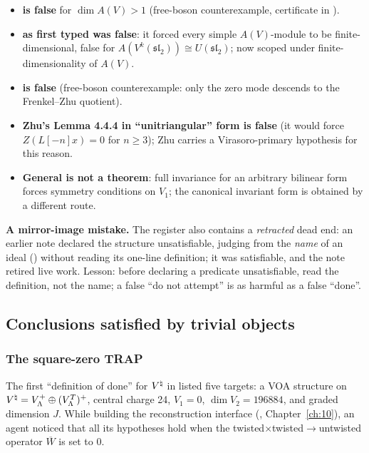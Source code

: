 \begin{itemize}
  . (The underlying cause was a helper
  definition returning a junk value on inhomogeneous vectors.)
\item \textbf{ is false} for $\dim A(V)>1$ (free-boson
  counterexample, certificate  in
  ).
\item \textbf{ as first typed was false}: it forced every simple
  $A(V)$-module to be finite-dimensional, false for $A(V^k(\mathfrak{sl}_2))\cong U(\mathfrak{sl}_2)$;
  now scoped under finite-dimensionality of $A(V)$.
\item \textbf{ is false} (free-boson counterexample: only the zero mode
  descends to the Frenkel--Zhu quotient).
\item \textbf{Zhu's Lemma 4.4.4 in ``unitriangular'' form is false} (it would force
  $Z(L[-n]x)=0$ for $n\ge3$); Zhu carries a Virasoro-primary hypothesis for this reason.
\item \textbf{General  is not a theorem}: full invariance for an arbitrary
  bilinear form forces symmetry conditions on $V_1$; the canonical invariant form is obtained by a
  different route.
\end{itemize}

\begin{warning}
\textbf{A mirror-image mistake.} The register also contains a \emph{retracted} dead end: an earlier
note declared the structure  unsatisfiable, judging from the \emph{name} of
an ideal () without reading its one-line definition; it was satisfiable, and the
note retired live work. Lesson: before declaring a predicate
unsatisfiable, read the definition, not the name; a false ``do not attempt'' is as harmful as a
false ``done''.
\end{warning}

\subsection{Conclusions satisfied by trivial objects}

\subsubsection{The square-zero TRAP}\label{ch15:sec:trap-sqzero}

The first ``definition of done'' for ${V^{\natural}}$ in  listed five
targets: a VOA structure on ${V^{\natural}}=V_\Lambda^+\oplus(V_\Lambda^T)^+$, central charge 24,
$V_1=0$, $\dim V_2=196884$, and graded dimension $J$. While building the reconstruction interface
(, Chapter~\ref{ch:10}), an agent noticed that all its hypotheses hold when the
twisted$\times$twisted$\to$untwisted operator $\overline W$ is set to $0$.

